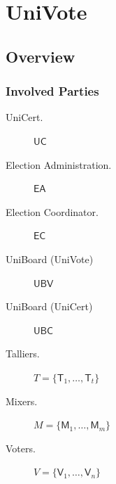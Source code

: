 \documentclass[bibtotoc,halfparskip,oneside]{scrreprt}
\newcommand{\EA}{\ensuremath{\mathsf{EA}}\xspace}
\newcommand{\EC}{\ensuremath{\mathsf{EC}}\xspace}
\newcommand{\UBC}{\ensuremath{\mathsf{UBC}}\xspace}
\newcommand{\UBV}{\ensuremath{\mathsf{UBV}}\xspace}
\newcommand{\UC}{\ensuremath{\mathsf{UC}}\xspace}
\newcommand{\Tallier}[1]{\ensuremath{\mathsf{T}_{#1}}\xspace}
\newcommand{\Mixer}[1]{\ensuremath{\mathsf{M}_{#1}}\xspace}
\newcommand{\Voter}[1]{\ensuremath{\mathsf{V}_{#1}}\xspace}
\begin{document}



\chapter{UniVote}

\section{Overview}


\subsection{Involved Parties}

\begin{description}
	\item[UniCert.] \UC
	\item[Election Administration.] \EA
	\item[Election Coordinator.] \EC
	\item[UniBoard (UniVote)] \UBV
	\item[UniBoard (UniCert)] \UBC
	\item[Talliers.] $T=\{\Tallier{1},\ldots,\Tallier{t}\}$
	\item[Mixers.] $M=\{\Mixer{1},\ldots,\Mixer{m}\}$
	\item[Voters.] $V=\{\Voter{1},\ldots,\Voter{n}\}$
\end{description}
\end{document}
